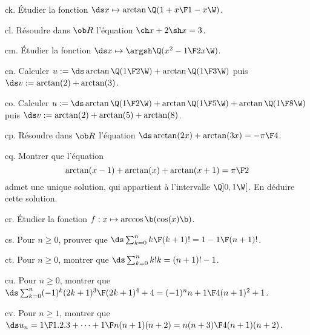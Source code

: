 \exo [Level=1,Fight=2,Learn=1,Field=\Fonctions,Type=\Exercices,Origin=] ck. 
Étudier la fonction $\ds x\mapsto\arctan\Q({1+x\F1-x}\W)$. 

\exo [Level=1,Fight=1,Learn=1,Field=\TrigonométrieHyperbolique,Type=\Exercices,Origin=] cl. Résoudre dans $\ob R$ l'équation $\ch x+2\sh x=3$. 

\exo [Level=1,Fight=2,Learn=1,Field=\Fonctions,Type=\Exercices,Origin=] cm. 
Étudier la fonction $\ds x\mapsto\argsh\Q({x^2-1\F2x}\W)$. 

\exo [Level=1,Fight=2,Learn=1,Field=\Fonctions,Type=\Exercices,Origin=] cn. 
Calculer $u:=\ds\arctan\Q({1\F2}\W)+\arctan\Q({1\F3}\W)$ puis $\ds v:=\arctan(2)+\arctan(3)$. 

\exo [Level=1,Fight=2,Learn=1,Field=\Fonctions,Type=\Exercices,Origin=] co. 
Calculer $u:=\ds\arctan\Q({1\F2}\W)+\arctan\Q({1\F5}\W)+\arctan\Q({1\F8}\W)$ puis $\ds v:=\arctan(2)+\arctan(5)+\arctan(8)$. 

\exo [Level=1,Fight=1,Learn=0,Field=\Fonctions,Type=\Exercices,Origin=] cp. 
Résoudre dans $\ob R$ l'équation $\ds\arctan(2x)+\arctan(3x)=-{\pi\F4}$.

\exo [Level=1,Fight=1,Learn=0,Field=\Fonctions,Type=\Exercices,Origin=] cq. 
Montrer que l'équation 
$$
\arctan(x-1)+\arctan(x)+\arctan(x+1)={\pi\F2}
$$
admet une unique solution, qui appartient à l'intervalle $\Q]0,1\W[$. En déduire cette solution. 

\exo [Level=1,Fight=2,Learn=1,Field=\Fonctions,Type=\TravauxDirigés,Origin=]cr. 
Étudier la fonction $f:x\mapsto\arccos\b(\cos(x)\b)$. 

\exo [Level=1,Fight=1,Learn=0,Field=\Récurrences,Type=\Exercices,Origin=\Capaces] cs. 
Pour $n\ge0$, prouver que $\ds\sum_{k=0}^n{k\F(k+1)!}=1-{1\F(n+1)!}$. 

\exo [Level=1,Fight=1,Learn=0,Field=\Récurrences,Type=\Exercices,Origin=\Capaces] ct. 
Pour $n\ge0$, montrer que $\ds\sum_{k=0}^nk!k=(n+1)!-1$. 
 
\exo [Level=1,Fight=1,Learn=0,Field=\Récurrences,Type=\Exercices,Origin=\Capaces] cu. 
Pour $n\ge0$, montrer que $\ds\sum_{k=0}^n(-1)^k{(2k+1)^3\F(2k+1)^4+4}=(-1)^n{n+1\F 4(n+1)^2+1}$. 

\exo [Level=1,Fight=1,Learn=0,Field=\Récurrences,Type=\Exercices,Origin=\Capaces] cv. 
Pour $n\ge1$, montrer que $\ds u_n={1\F1.2.3}+\cdots+{1\F n(n+1)(n+2)}={n(n+3)\F4(n+1)(n+2)}$. 

